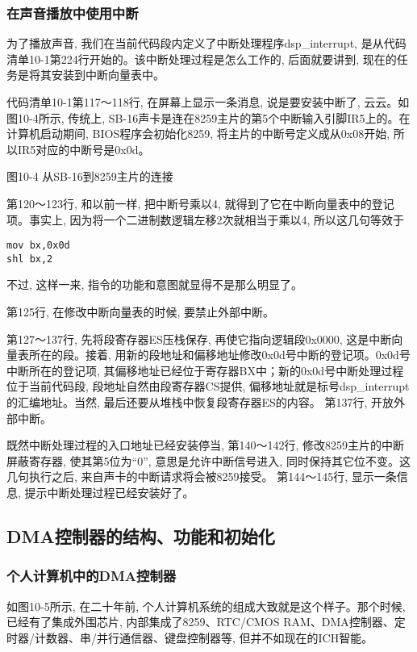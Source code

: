 \documentclass[12pt]{article}
\begin{document}
\begin{CJK}{UTF8}{gbsn}
\subsubsection{在声音播放中使用中断}
为了播放声音, 我们在当前代码段内定义了中断处理程序dsp\_{}interrupt, 是从代码清单10-1第224行开始的。该中断处理过程是怎么工作的, 后面就要讲到, 现在的任务是将其安装到中断向量表中。

代码清单10-1第117～118行, 在屏幕上显示一条消息, 说是要安装中断了, 云云。如图10-4所示, 传统上, SB-16声卡是连在8259主片的第5个中断输入引脚IR5上的。在计算机启动期间, BIOS程序会初始化8259, 将主片的中断号定义成从0x08开始, 所以IR5对应的中断号是0x0d。
 
图10-4  从SB-16到8259主片的连接

第120～123行, 和以前一样, 把中断号乘以4, 就得到了它在中断向量表中的登记项。事实上, 因为将一个二进制数逻辑左移2次就相当于乘以4, 所以这几句等效于

\begin{verbatim}
mov bx,0x0d
shl bx,2
\end{verbatim}

不过, 这样一来, 指令的功能和意图就显得不是那么明显了。

第125行, 在修改中断向量表的时候, 要禁止外部中断。

第127～137行, 先将段寄存器ES压栈保存, 再使它指向逻辑段0x0000, 这是中断向量表所在的段。接着, 用新的段地址和偏移地址修改0x0d号中断的登记项。0x0d号中断所在的登记项, 其偏移地址已经位于寄存器BX中；新的0x0d号中断处理过程位于当前代码段, 段地址自然由段寄存器CS提供, 偏移地址就是标号dsp\_{}interrupt的汇编地址。当然, 最后还要从堆栈中恢复段寄存器ES的内容。
第137行, 开放外部中断。

既然中断处理过程的入口地址已经安装停当, 第140～142行, 修改8259主片的中断屏蔽寄存器, 使其第5位为“0”, 意思是允许中断信号进入, 同时保持其它位不变。这几句执行之后, 来自声卡的中断请求将会被8259接受。
第144～145行, 显示一条信息, 提示中断处理过程已经安装好了。

\subsection{DMA控制器的结构、功能和初始化}
\subsubsection{个人计算机中的DMA控制器}
如图10-5所示, 在二十年前, 个人计算机系统的组成大致就是这个样子。那个时候, 已经有了集成外围芯片, 内部集成了8259、RTC/CMOS RAM、DMA控制器、定时器/计数器、串/并行通信器、键盘控制器等, 但并不如现在的ICH智能。
 

\end{CJK}
\end{document}
